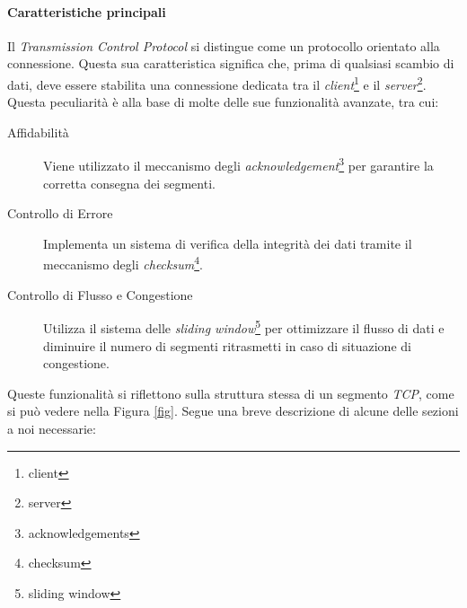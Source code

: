 \paragraph{ Caratteristiche principali}
\noindent Il \emph{Transmission Control Protocol} si distingue come un protocollo orientato alla connessione. Questa sua caratteristica significa che, prima di qualsiasi scambio di dati, deve essere stabilita una connessione dedicata tra il \emph{client}\footnote{\gls{client}} e il \emph{server}\footnote{\gls{server}}.
Questa peculiarità è alla base di molte delle sue funzionalità avanzate, tra cui:
\begin{description}
    \item[Affidabilità] Viene utilizzato il meccanismo degli \emph{acknowledgement}\footnote{\gls{acknowledgements}} per garantire la corretta consegna dei segmenti.

    \item[Controllo di Errore] Implementa un sistema di verifica della integrità dei dati tramite il meccanismo degli \emph{checksum}\footnote{\gls{checksum}}.
    
    \item[Controllo di Flusso e Congestione] Utilizza il sistema delle \emph{sliding window}\footnote{\gls{sliding window}} per ottimizzare il flusso di dati e diminuire il numero di segmenti ritrasmetti in caso di situazione di congestione.
\end{description}

\noindent Queste funzionalità si riflettono sulla struttura stessa di un segmento \emph{TCP}, come si può vedere nella Figura \ref{fig}. Segue una breve descrizione di alcune delle sezioni a noi necessarie:

